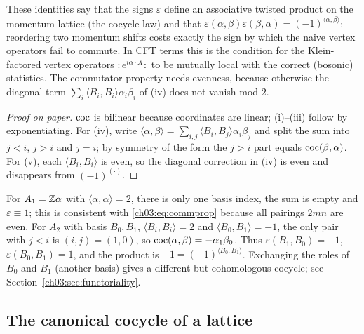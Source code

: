 \begin{physics}
These identities say that the signs $\varepsilon$ define an associative twisted product on the momentum lattice (the cocycle law) and that $\varepsilon(\alpha,\beta)\varepsilon(\beta,\alpha)=(-1)^{\langle\alpha,\beta\rangle}$: reordering two momentum shifts costs exactly the sign by which the naive vertex operators fail to commute. In CFT terms this is the condition for the Klein-factored vertex operators $:\!e^{i\alpha\cdot X}\!:$ to be mutually local with the correct (bosonic) statistics. The commutator property needs evenness, because otherwise the diagonal term $\sum_i\langle B_i,B_i\rangle\alpha_i\beta_i$ of (iv) does not vanish mod $2$.
\end{physics}

\begin{proof}[Proof on paper]
$\operatorname{coc}$ is bilinear because coordinates are linear; (i)--(iii) follow by exponentiating.
For (iv), write $\langle\alpha,\beta\rangle=\sum_{i,j}\langle B_i,B_j\rangle\alpha_i\beta_j$ and
split the sum into $j<i$, $j>i$ and $j=i$; by symmetry of the form the $j>i$ part equals
$\operatorname{coc}(\beta,\alpha)$. For (v), each $\langle B_i,B_i\rangle$ is even, so the diagonal
correction in (iv) is even and disappears from $(-1)^{(\cdot)}$.
\end{proof}

\begin{example}[$A_1$ and $A_2$]\label{ch03:ex:A1A2}
For $A_1={\mathbb{Z}}\alpha$ with $\langle\alpha,\alpha\rangle=2$, there is only one basis index, the sum is
empty and $\varepsilon\equiv1$; this is consistent with \eqref{ch03:eq:commprop} because all
pairings $2mn$ are even. For $A_2$ with basis $B_0,B_1$, $\langle B_i,B_i\rangle=2$ and
$\langle B_0,B_1\rangle=-1$, the only pair with $j<i$ is $(i,j)=(1,0)$, so
$\operatorname{coc}(\alpha,\beta)=-\alpha_1\beta_0$. Thus $\varepsilon(B_1,B_0)=-1$,
$\varepsilon(B_0,B_1)=1$, and the product is $-1=(-1)^{\langle B_0,B_1\rangle}$. Exchanging the
roles of $B_0$ and $B_1$ (another basis) gives a different but cohomologous cocycle; see
Section~\ref{ch03:sec:functoriality}.
\end{example}

\subsection{The canonical cocycle of a lattice}

